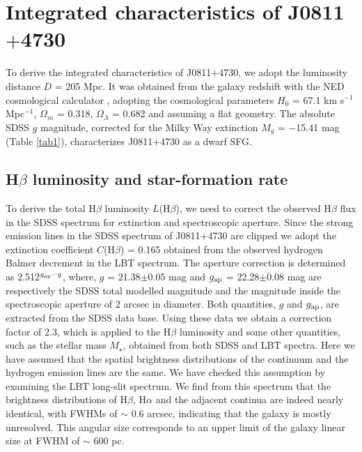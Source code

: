 \documentclass[useAMS,usenatbib]{mn2e}
\begin{document}


\section{Integrated characteristics of J0811$+$4730}
\label{sec:integr}

To derive the integrated characteristics of J0811$+$4730, we adopt 
the luminosity distance $D$ = 205 Mpc. It was obtained from the galaxy
redshift with the NED cosmological calculator 
\citep{W06}, adopting the cosmological parameters 
$H_0$ = 67.1 km s$^{-1}$ Mpc$^{-1}$, $\Omega_m$ = 0.318, $\Omega_\Lambda$ = 
0.682 \citep{P14} and assuming a flat geometry.
The absolute SDSS $g$ magnitude, corrected for the Milky Way
extinction $M_g$ = $-$15.41 mag (Table \ref{tab1}), characterizes J0811$+$4730 
as a dwarf SFG.

\subsection{H$\beta$ luminosity and star-formation rate}

To derive the total H$\beta$ luminosity $L$(H$\beta$), we need to correct the
observed H$\beta$ flux in the SDSS spectrum for extinction and spectroscopic 
aperture. Since the strong emission lines in the SDSS spectrum of J0811$+$4730
are clipped we adopt the extinction coefficient $C$(H$\beta$) = 0.165 obtained 
from the observed hydrogen Balmer decrement in the LBT spectrum. The aperture 
correction is determined as 2.512$^{g_{\rm ap}-g}$, where, $g$ = 21.38$\pm$0.05 mag 
and $g_{\rm ap}$ = 22.28$\pm$0.08 mag are respectively the SDSS total
modelled magnitude and the magnitude inside the spectroscopic aperture 
of 2 arcsec in diameter.
Both quantities, $g$ and $g_{\rm ap}$, are extracted 
from the SDSS data base. Using these data we obtain a correction factor of
2.3, which is applied to the H$\beta$ luminosity and some other 
quantities, such as the stellar mass $M_\star$, obtained from 
both SDSS and LBT spectra.
Here we have assumed that the spatial brightness distributions of 
the continuum and the hydrogen emission lines are the same. We have checked
this assumption by examining the LBT long-slit spectrum. 
We find from this spectrum that the brightness distributions of H$\beta$, 
H$\alpha$ and the adjacent continua are indeed nearly identical, with FWHMs of 
$\sim$ 0.6 arcsec, indicating that the galaxy 
is mostly unresolved. This angular size corresponds to an upper limit
of the galaxy linear size at FWHM of $\sim$ 600 pc.
 
\end{document}
